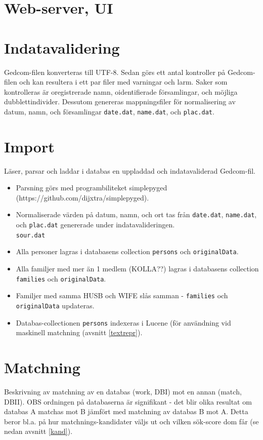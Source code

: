 \documentclass[swedish,11pt]{article}
\begin{document}
\section{Web-server, UI}
\label{UI}

\section{Indatavalidering}
\label{indatavalidering}
Gedcom-filen konverteras till UTF-8. Sedan
görs ett antal kontroller på Gedcom-filen och kan resultera i
ett par filer med varningar och larm. Saker som kontrolleras är oregistrerade namn,
oidentifierade församlingar, och möjliga dubblettindivider.
Dessutom genereras
mappningsfiler för normalisering av datum, namn, och församlingar
\verb+date.dat+, \verb+name.dat+, och \verb+plac.dat+.
\section{Import}
\label{import}
Läser, parsar och laddar i databas en uppladdad och indatavaliderad
Gedcom-fil.
\begin{itemize}
\item Parsning
görs med programbiliteket simplepyged
(https://github.com/dijxtra/simplepyged).
\item Normaliserade värden på datum, namn, och ort tas från
  \verb+date.dat+, \verb+name.dat+, och \verb+plac.dat+ genererade
  under indatavalideringen.\\
\verb+sour.dat+
\item Alla personer lagras i databasens collection \verb+persons+ och \verb+originalData+.
\item Alla familjer med mer än 1 medlem (KOLLA??) lagras i databasens collection
  \verb+families+ och \verb+originalData+.
\item Familjer med samma HUSB och WIFE slås samman - \verb+families+
  och \verb+originalData+ updateras.
\item Databas-collectionen \verb+persons+ indexeras i Lucene (för
  användning vid maskinell matchning (avsnitt \ref{textrepr}).
\end{itemize}

\section{Matchning}
\label{match}
Beskrivning av matchning av en databas (work, DBI) mot en annan
(match, DBII). OBS ordningen på databaserna är signifikant - det blir
olika resultat om databas A matchas mot B jämfört med matchning av
databas B mot A. Detta beror bl.a. på hur matchnings-kandidater väljs
ut och vilken sök-score dom får (se nedan avsnitt \ref{kand}).
\end{document}

